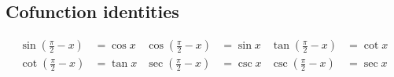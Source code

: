 \subsection*{Cofunction identities}

\begin{align*}
  \sin(\frac{\pi}{2} - x) &= \cos x
  &\cos(\frac{\pi}{2} - x) &= \sin x
  &\tan(\frac{\pi}{2} - x) &= \cot x\\
  \cot(\frac{\pi}{2} - x) &= \tan x
  &\sec(\frac{\pi}{2} - x) &= \csc x
  &\csc(\frac{\pi}{2} - x) &= \sec x
\end{align*}